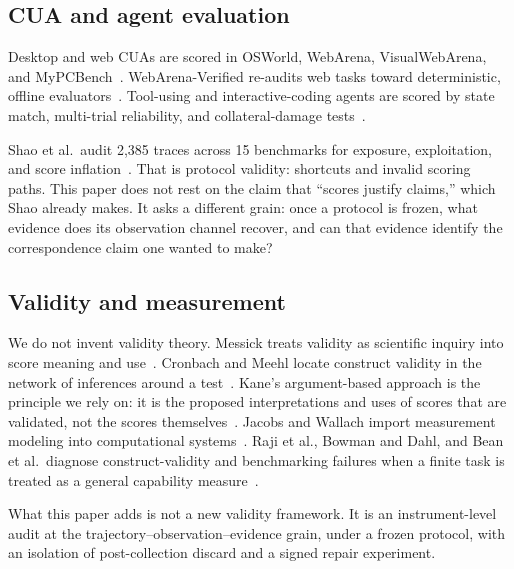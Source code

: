 \documentclass[sigconf,anonymous]{aamas}
\begin{document}
\subsection{CUA and agent evaluation}
\label{sec:rw-cua}

Desktop and web CUAs are scored in OSWorld, WebArena, VisualWebArena, and MyPCBench~\citep{xie2024osworld,zhou2024webarena,koh2024visualwebarena,jang2026mypcbench}.
WebArena-Verified re-audits web tasks toward deterministic, offline evaluators~\citep{hattami2025webarena}.
Tool-using and interactive-coding agents are scored by state match, multi-trial reliability, and collateral-damage tests~\citep{yao2025taubench,trivedi2024appworld}.

Shao et al.\ audit 2{,}385 traces across 15 benchmarks for exposure, exploitation, and score inflation~\citep{shao2026protocolvalidity}.
That is protocol validity: shortcuts and invalid scoring paths.
This paper does not rest on the claim that ``scores justify claims,'' which Shao already makes.
It asks a different grain: once a protocol is frozen, what evidence does its observation channel recover, and can that evidence identify the correspondence claim one wanted to make?

\subsection{Validity and measurement}
\label{sec:rw-validity}

We do not invent validity theory.
Messick treats validity as scientific inquiry into score meaning and use~\citep{messick1995validity}.
Cronbach and Meehl locate construct validity in the network of inferences around a test~\citep{cronbach1955construct}.
Kane's argument-based approach is the principle we rely on: it is the proposed interpretations and uses of scores that are validated, not the scores themselves~\citep{kane1992argument,kane2013validating}.
Jacobs and Wallach import measurement modeling into computational systems~\citep{jacobs2021measurement}.
Raji et al., Bowman and Dahl, and Bean et al.\ diagnose construct-validity and benchmarking failures when a finite task is treated as a general capability measure~\citep{raji2021everything,bowman2021fix,bean2025measuring}.

What this paper adds is not a new validity framework.
It is an instrument-level audit at the trajectory--observation--evidence grain, under a frozen protocol, with an isolation of post-collection discard and a signed repair experiment.
\end{document}
